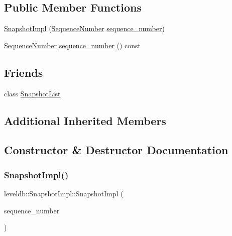 \subsection*{Public Member Functions}
\begin{DoxyCompactItemize}
\item 
\mbox{\hyperlink{classleveldb_1_1_snapshot_impl_a4302ef9df8ad8a2558038dec42445822}{Snapshot\+Impl}} (\mbox{\hyperlink{namespaceleveldb_a5481ededd221c36d652c371249f869fa}{Sequence\+Number}} \mbox{\hyperlink{classleveldb_1_1_snapshot_impl_af363ab5b69a424d7ee026f847d808fba}{sequence\+\_\+number}})
\item 
\mbox{\hyperlink{namespaceleveldb_a5481ededd221c36d652c371249f869fa}{Sequence\+Number}} \mbox{\hyperlink{classleveldb_1_1_snapshot_impl_af363ab5b69a424d7ee026f847d808fba}{sequence\+\_\+number}} () const
\end{DoxyCompactItemize}
\subsection*{Friends}
\begin{DoxyCompactItemize}
\item 
class \mbox{\hyperlink{classleveldb_1_1_snapshot_impl_abe14b2fb5e32159324c619e1a42327a0}{Snapshot\+List}}
\end{DoxyCompactItemize}
\subsection*{Additional Inherited Members}


\subsection{Constructor \& Destructor Documentation}
\mbox{\label{classleveldb_1_1_snapshot_impl_a4302ef9df8ad8a2558038dec42445822}} 
\subsubsection{\texorpdfstring{SnapshotImpl()}{SnapshotImpl()}}
{\footnotesize\ttfamily leveldb\+::\+Snapshot\+Impl\+::\+Snapshot\+Impl (\begin{DoxyParamCaption}\item[{\mbox{\hyperlink{namespaceleveldb_a5481ededd221c36d652c371249f869fa}{Sequence\+Number}}}]{sequence\+\_\+number }\end{DoxyParamCaption})\hspace{0.3cm}{\ttfamily [inline]}}



